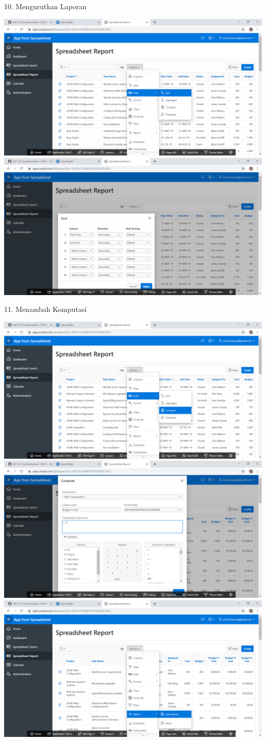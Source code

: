 \documentclass{article}
\begin{document}
\item 10. Mengurutkan Laporan
\begin{center}
  \includegraphics[width=10cm\textwidth]{gambar/16.png}
  \includegraphics[width=10cm\textwidth]{gambar/17.png}
  
\end{center}
\newpage
\item 11. Menambah Komputasi
\begin{center}
    \includegraphics[width=10cm\textwidth]{gambar/18.png}
    \includegraphics[width=10cm\textwidth]{gambar/19.png}
    \includegraphics[width=10cm\textwidth]{gambar/20.png}

\end{center}






    
    
\end{document}
